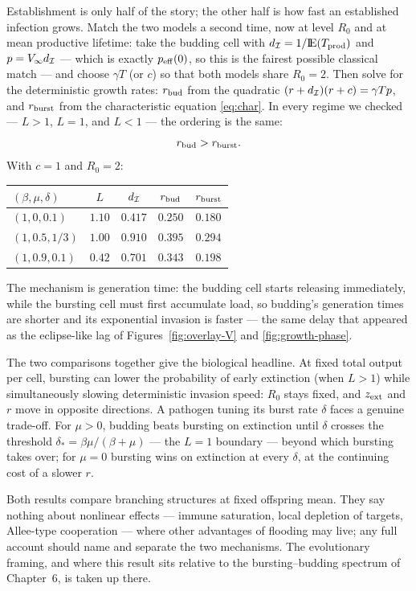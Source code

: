 Establishment is only half of the story; the other half is how fast an
established infection grows. Match the two models a second time, now at
level $R_0$ and at mean productive lifetime: take the budding cell with
$d_{\mathcal{I}}=1/{\rm I}\!{\rm E}(T_{\rm prod})$ and $p=V_\infty d_{\mathcal{I}}$ --- which
is exactly $p_{\rm eff}(0)$, so this is the fairest possible classical
match --- and choose $\gamma T$ (or $c$) so that both models share
$R_0=2$. Then solve for the deterministic growth rates: $r_{\rm bud}$ from
the quadratic $(r+d_{\mathcal{I}})(r+c)=\gamma Tp$, and $r_{\rm burst}$ from
the characteristic equation \eqref{eq:char}. In every regime we checked
--- $L>1$, $L=1$, and $L<1$ --- the ordering is the same:
\begin{equation}
r_{\rm bud}>r_{\rm burst}.
\end{equation}
With $c=1$ and $R_0=2$:
\begin{center}
\renewcommand{\arraystretch}{1.2}
\begin{tabular}{@{}lcccc@{}}
\toprule
$(\beta,\mu,\delta)$ & $L$ & $d_{\mathcal{I}}$ & $r_{\rm bud}$ & $r_{\rm burst}$ \\
\midrule
$(1,0,0.1)$ & $1.10$ & $0.417$ & $0.250$ & $0.180$ \\
$(1,0.5,1/3)$ & $1.00$ & $0.910$ & $0.395$ & $0.294$ \\
$(1,0.9,0.1)$ & $0.42$ & $0.701$ & $0.343$ & $0.198$ \\
\bottomrule
\end{tabular}
\end{center}
The mechanism is generation time: the budding cell starts releasing
immediately, while the bursting cell must first accumulate load, so
budding's generation times are shorter and its exponential invasion is
faster --- the same delay that appeared as the eclipse-like lag of
Figures~\ref{fig:overlay-V} and \ref{fig:growth-phase}.

The two comparisons together give the biological headline. At fixed total
output per cell, bursting can lower the probability of early extinction
(when $L>1$) while simultaneously slowing deterministic invasion speed:
$R_0$ stays fixed, and $z_{\rm ext}$ and $r$ move in opposite directions.
A pathogen tuning its burst rate $\delta$ faces a genuine trade-off. For
$\mu>0$, budding beats bursting on extinction until $\delta$ crosses the
threshold $\delta_*=\beta\mu/(\beta+\mu)$ --- the $L=1$ boundary --- beyond
which bursting takes over; for $\mu=0$ bursting wins on extinction at every
$\delta$, at the continuing cost of a slower $r$.

\begin{remark}
Both results compare branching structures at fixed offspring mean. They say
nothing about nonlinear effects --- immune saturation, local depletion of
targets, Allee-type cooperation --- where other advantages of flooding
may live; any full account should name and separate the two mechanisms.
The evolutionary framing, and where this result sits relative to the
bursting--budding spectrum of Chapter~6, is taken up there.
\end{remark}
